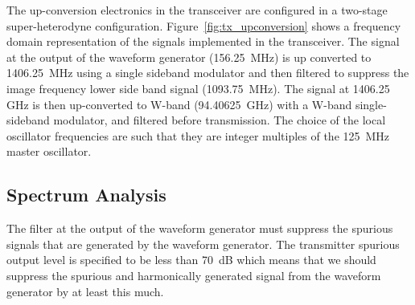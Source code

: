 \documentclass[12pt,letterpaper]{article}
\begin{document}
The up-conversion electronics in the transceiver are configured in a
two-stage super-heterodyne
configuration. Figure~\ref{fig:tx_upconversion} shows a frequency
domain representation of the signals implemented in the
transceiver. The signal at the output of the waveform generator
(156.25~MHz) is up converted to 1406.25~MHz using a single sideband
modulator and then filtered to suppress the image frequency lower side
band signal (1093.75~MHz). The signal at 1406.25 GHz is then
up-converted to W-band (94.40625~GHz) with a W-band single-sideband
modulator, and filtered before transmission. The choice of the local
oscillator frequencies are such that they are integer multiples of the
125~MHz master oscillator.


\subsection{Spectrum Analysis}

The filter at the output of the waveform generator must suppress the
spurious signals that are generated by the waveform generator. The
transmitter spurious output level is specified to be less than 70~dB
which means that we should suppress the spurious and harmonically
generated signal from the waveform generator by at least this much.
\end{document}
